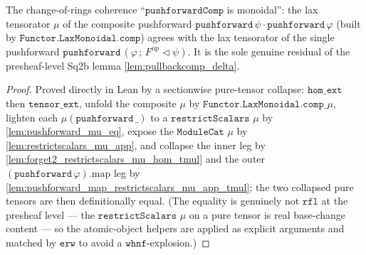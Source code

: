 \begin{lemma}\leanok
  \label{lem:pushforwardcomp_lax_mu}
  The change-of-rings coherence ``\(\mathtt{pushforwardComp}\) is monoidal'': the lax
  tensorator \(\mu\) of the composite pushforward
  \(\mathtt{pushforward}\,\psi \cdot \mathtt{pushforward}\,\varphi\) (built by
  \(\mathtt{Functor.LaxMonoidal.comp}\)) agrees with the lax tensorator of the single
  pushforward \(\mathtt{pushforward}\,(\varphi \,;\, F^{\mathrm{op}} \!\lhd\! \psi)\). It is
  the sole genuine residual of the presheaf-level Sq2b lemma \cref{lem:pullbackcomp_delta}.
\end{lemma}
\begin{proof}
  \leanok
  Proved directly in Lean by a sectionwise pure-tensor collapse: \(\mathtt{hom\_ext}\) then
  \(\mathtt{tensor\_ext}\), unfold the composite \(\mu\) by \(\mathtt{Functor.LaxMonoidal.comp\_}\mu\),
  lighten each \(\mu(\mathtt{pushforward}\,\_)\) to a \(\mathtt{restrictScalars}\) \(\mu\) by
  \cref{lem:pushforward_mu_eq}, expose the \(\mathtt{ModuleCat}\) \(\mu\) by
  \cref{lem:restrictscalars_mu_app}, and collapse the inner leg by
  \cref{lem:forget2_restrictscalars_mu_hom_tmul} and the outer
  \((\mathtt{pushforward}\,\varphi).\mathrm{map}\) leg by
  \cref{lem:pushforward_map_restrictscalars_mu_app_tmul}; the two collapsed pure tensors are
  then definitionally equal. (The equality is genuinely not \(\mathtt{rfl}\) at the presheaf
  level --- the \(\mathtt{restrictScalars}\) \(\mu\) on a pure tensor is real base-change
  content --- so the atomic-object helpers are applied as explicit arguments and matched by
  \(\mathtt{erw}\) to avoid a \(\mathtt{whnf}\)-explosion.)
\end{proof}

